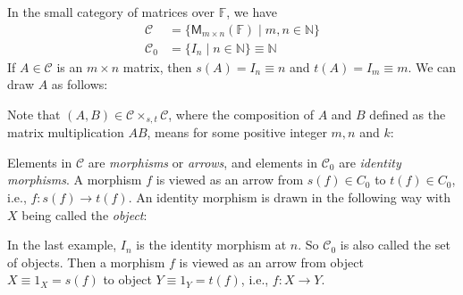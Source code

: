 \documentclass[
	11pt, %
	fleqn, %
	a4paper, %
]{LegrandOrangeBook}
\newcommand{\F}{\mathbb{F}} %
\newcommand{\M}[2]{\mathsf{M}_{#1}(#2)} %
\newcommand{\C}{\mathcal{C}} %
\begin{document}
\begin{example}
    In the small category of matrices over $\F$, we have 
    \[
        \begin{split}
            \C &= \{ \M{m \times n}{\F} \mid m, n \in \mathbb{N} \} \\
            \C_0 &= \{ I_n \mid n \in \mathbb{N} \} \equiv \mathbb{N}
        \end{split}
    \]
    If $A \in \C$ is an $m \times n$ matrix, then $s(A) = I_n \equiv n$ and $t(A) = I_m \equiv m$. We can draw $A$ as follows:
    \begin{center}
    \end{center}
    Note that $(A, B) \in \C \times_{s, t} \C$, where the composition of $A$ and $B$ defined as the matrix multiplication $AB$, means for some positive integer $m, n$ and $k$:
    \begin{center}
    \end{center}
\end{example}

\begin{remark}
    Elements in $\C$ are \emph{morphisms} or \emph{arrows}, and elements in $\C_0$ are \emph{identity morphisms}. A morphism $f$ is viewed as an arrow from $s(f) \in C_0$ to $t(f) \in C_0$, i.e., $f : s(f) \to t(f)$. 
    An identity morphism is drawn in the following way with $X$ being called the \emph{object}:
    \begin{center}
    \end{center}
    In the last example, $I_n$ is the identity morphism at $n$. So $\C_0$ is also called the set of objects. Then a morphism $f$ is viewed as an arrow from object $X \equiv 1_X = s(f)$ to object $Y \equiv 1_Y = t(f)$, i.e., $f : X \to Y$.
\end{remark}
\end{document}
